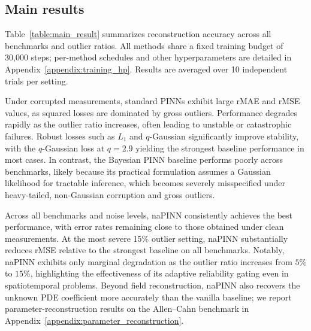\documentclass{article}
\theoremstyle{plain}
\theoremstyle{definition}
\theoremstyle{remark}
\begin{document}
\subsection{Main results}

Table~\ref{table:main_result} summarizes reconstruction accuracy across all benchmarks and outlier ratios. All methods share a fixed training budget of 30{,}000 steps; per-method schedules and other hyperparameters are detailed in Appendix~\ref{appendix:training_hp}. Results are averaged over 10 independent trials per setting.

Under corrupted measurements, standard PINNs exhibit large rMAE and rMSE values, as squared losses are dominated by gross outliers. Performance degrades rapidly as the outlier ratio increases, often leading to unstable or catastrophic failures. Robust losses such as $L_1$ and $q$-Gaussian significantly improve stability, with the $q$-Gaussian loss at $q=2.9$ yielding the strongest baseline performance in most cases. In contrast, the Bayesian PINN baseline performs poorly across benchmarks, likely because its practical formulation assumes a Gaussian likelihood for tractable inference, which becomes severely misspecified under heavy-tailed, non-Gaussian corruption and gross outliers.

Across all benchmarks and noise levels, naPINN consistently achieves the best performance, with error rates remaining close to those obtained under clean measurements. At the most severe 15\% outlier setting, naPINN substantially reduces rMSE relative to the strongest baseline on all benchmarks. Notably, naPINN exhibits only marginal degradation as the outlier ratio increases from $5\%$ to $15\%$, highlighting the effectiveness of its adaptive reliability gating even in spatiotemporal problems. Beyond field reconstruction, naPINN also recovers the unknown PDE coefficient more accurately than the vanilla baseline; we report parameter-reconstruction results on the Allen--Cahn benchmark in Appendix~\ref{appendix:parameter_reconstruction}.
\end{document}
